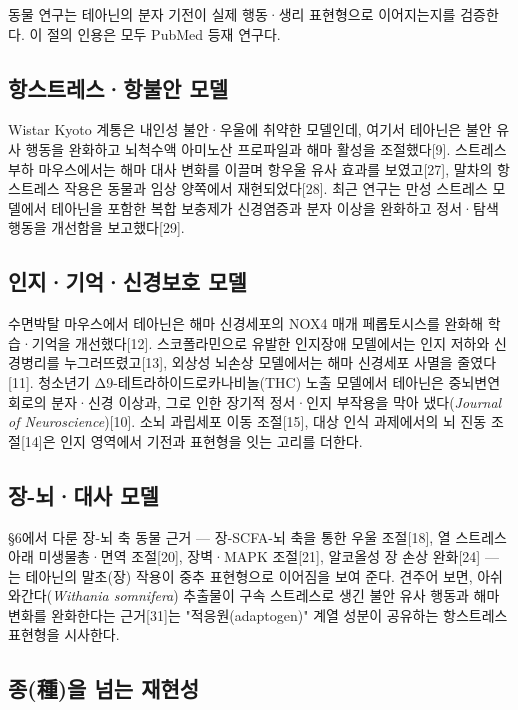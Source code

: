 \documentclass[12pt,oneside]{book}
\begin{document}
동물 연구는 테아닌의 분자 기전이 실제 행동·생리 표현형으로 이어지는지를 검증한다. 이 절의 인용은 모두 PubMed 등재 연구다.

\subsection{항스트레스·항불안 모델}

Wistar Kyoto 계통은 내인성 불안·우울에 취약한 모델인데, 여기서 테아닌은 불안 유사 행동을 완화하고 뇌척수액 아미노산 프로파일과 해마 활성을 조절했다[9]. 스트레스 부하 마우스에서는 해마 대사 변화를 이끌며 항우울 유사 효과를 보였고[27], 말차의 항스트레스 작용은 동물과 임상 양쪽에서 재현되었다[28]. 최근 연구는 만성 스트레스 모델에서 테아닌을 포함한 복합 보충제가 신경염증과 분자 이상을 완화하고 정서·탐색 행동을 개선함을 보고했다[29].

\subsection{인지·기억·신경보호 모델}

수면박탈 마우스에서 테아닌은 해마 신경세포의 NOX4 매개 페롭토시스를 완화해 학습·기억을 개선했다[12]. 스코폴라민으로 유발한 인지장애 모델에서는 인지 저하와 신경병리를 누그러뜨렸고[13], 외상성 뇌손상 모델에서는 해마 신경세포 사멸을 줄였다[11]. 청소년기 Δ9-테트라하이드로카나비놀(THC) 노출 모델에서 테아닌은 중뇌변연 회로의 분자·신경 이상과, 그로 인한 장기적 정서·인지 부작용을 막아 냈다(\textit{Journal of Neuroscience})[10]. 소뇌 과립세포 이동 조절[15], 대상 인식 과제에서의 뇌 진동 조절[14]은 인지 영역에서 기전과 표현형을 잇는 고리를 더한다.

\subsection{장-뇌·대사 모델}

§6에서 다룬 장-뇌 축 동물 근거 — 장-SCFA-뇌 축을 통한 우울 조절[18], 열 스트레스 아래 미생물총·면역 조절[20], 장벽·MAPK 조절[21], 알코올성 장 손상 완화[24] — 는 테아닌의 말초(장) 작용이 중추 표현형으로 이어짐을 보여 준다. 견주어 보면, 아쉬와간다(\textit{Withania somnifera}) 추출물이 구속 스트레스로 생긴 불안 유사 행동과 해마 변화를 완화한다는 근거[31]는 "적응원(adaptogen)" 계열 성분이 공유하는 항스트레스 표현형을 시사한다.

\subsection{종(種)을 넘는 재현성}
\end{document}
